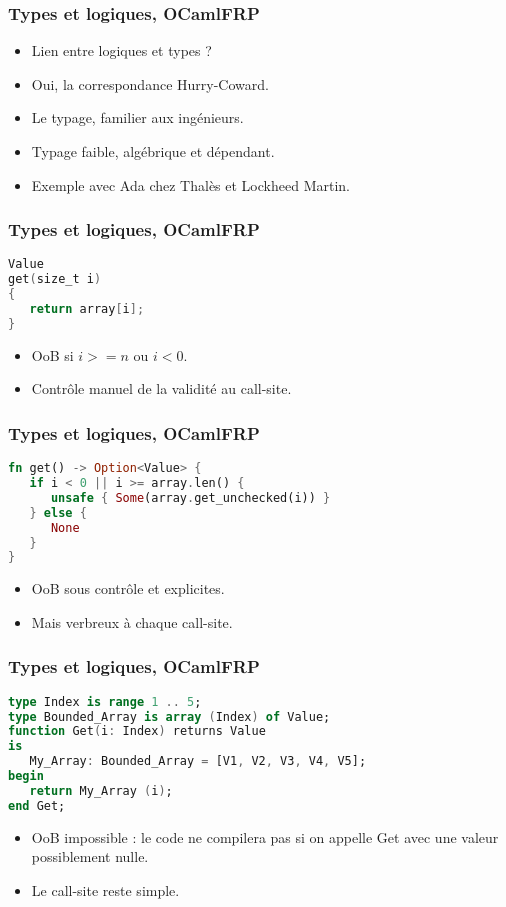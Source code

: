 \documentclass{beamer}
\begin{document}

\begin{frame}
\frametitle{Types et logiques, OCamlFRP}

\begin{itemize}
\item Lien entre logiques et types ?
\item Oui, la correspondance Hurry-Coward.
\item Le typage, familier aux ingénieurs.
\item Typage faible, algébrique et dépendant.
\item Exemple avec Ada chez Thalès et Lockheed
      Martin.
\end{itemize}
\end{frame}

\begin{frame}[fragile]
\frametitle{Types et logiques, OCamlFRP}

\begin{lstlisting}[language=C]
Value
get(size_t i)
{
   return array[i];
}
\end{lstlisting}

\begin{itemize}
\item OoB si $i >= n$ ou $i < 0$.
\item Contrôle manuel de la validité au call-site.
\end{itemize}
\end{frame}

\begin{frame}[fragile]
\frametitle{Types et logiques, OCamlFRP}

\begin{lstlisting}[language=Rust]
fn get() -> Option<Value> {
   if i < 0 || i >= array.len() {
      unsafe { Some(array.get_unchecked(i)) }
   } else {
      None
   }
}
\end{lstlisting}

\begin{itemize}
\item OoB sous contrôle et explicites.
\item Mais verbreux à chaque call-site.
\end{itemize}
\end{frame}

\begin{frame}[fragile]
\frametitle{Types et logiques, OCamlFRP}

\begin{lstlisting}[language=Ada]
type Index is range 1 .. 5;
type Bounded_Array is array (Index) of Value;
function Get(i: Index) returns Value
is
   My_Array: Bounded_Array = [V1, V2, V3, V4, V5];
begin
   return My_Array (i);
end Get;
\end{lstlisting}

\begin{itemize}
\item OoB impossible : le code ne compilera pas si
      on appelle Get avec une valeur possiblement
      nulle.
\item Le call-site reste simple.
\end{itemize}
\end{frame}
\end{document}
